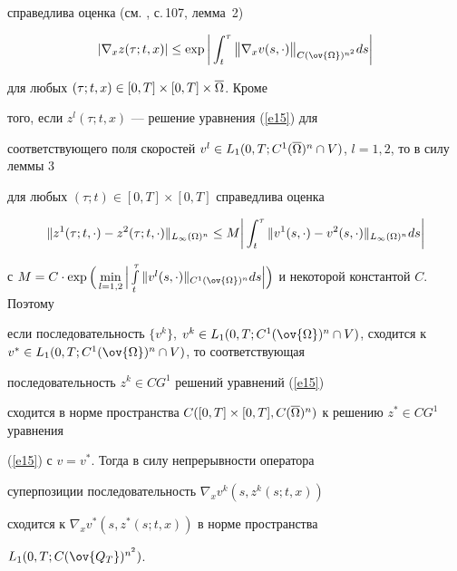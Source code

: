 \begin{pf}
справедлива оценка (см. \cite{OS}, с.\,107, лемма~2)


\begin{equation}\label{e241}


|\nabla_x z (\tau;t,x)| \le


\exp\bigg|\intl{t}{\tau}\big\|\nabla_x v


(s,\cdot)\big\|_{C(\ov{\Om})^{n^2}}ds\bigg|


\end{equation}


для любых $(\tau;t,x)\in [0,T] \times [0,T] \times \overline{\Omega}$. Кроме


того, если $z^l(\tau;t,x)$ --- решение уравнения (\ref{e15}) для


соответствующего поля скоростей $v^l \in


L_1(0,T;C^1(\overline{\Om})^n \cap V)$, $l=1,2$, то в силу леммы 3


\cite{OS} для любых $(\tau;t)\in [0,T] \times [0,T]$ справедлива оценка


$$


\|z^1(\tau;t,\cdot)-z^2(\tau;t,\cdot)\|_{L_{\infty}(\Om)^n} \le


M\bigg|\intl{t}{\tau}\|v^1(s,\cdot)-


v^2(s,\cdot)\|_{L_{\infty}(\Om)^n}ds\bigg|


$$


с $M=C\cdot\exp\Big(\minl


{l=1,2}\Big|\int\limits_{t}^{\tau}\|v^l(s,\cdot)\|_{C^1(\ov{


\Om})^n}ds\Big|\Big)$ и некоторой константой $C$. Поэтому


если последовательность $\{v^k\}$, $v^k \in


L_1(0,T;C^1(\ov{\Om})^n \cap V)$, сходится к $v^* \in


L_1(0,T;C^1(\ov{\Om})^n \cap V)$, то соответствующая


последовательность $z^k\in CG^1$ решений уравнений (\ref{e15})


сходится в норме пространства $C([0,T] \times [0,T],


C(\overline{\Om})^n)$ к решению $z^* \in CG^1$ уравнения


(\ref{e15}) с $v=v^*$. Тогда в силу непрерывности оператора


суперпозиции последовательность $\nabla_x {v^k}(s,z^k(s;t,x))$


сходится к $\nabla_x {v^*}(s,z^*(s;t,x))$ в норме пространства


$L_1(0,T;C(\ov{Q_T})^{n^2})$.






\end{pf}

